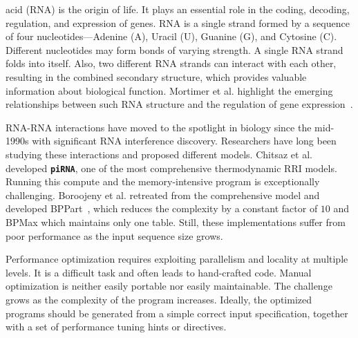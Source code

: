  acid (RNA) is the origin of life. It plays an essential role in the coding, decoding, regulation, and expression of genes. RNA is a single strand formed by a sequence of four nucleotides---Adenine (A), Uracil (U), Guanine (G), and Cytosine (C). Different nucleotides may form bonds of varying strength. A single RNA strand folds into itself. Also, two different RNA strands can interact with each other, resulting in the combined secondary structure, which provides valuable information about biological function. Mortimer et al. highlight the emerging relationships between such RNA structure and the regulation of gene expression~\cite{Mortimer_2014}.

RNA-RNA interactions have moved to the spotlight in biology since the mid-1990s with significant RNA interference discovery. Researchers have long been studying these interactions and proposed different models. Chitsaz et al.\cite{Chitsaz2009} developed \textbf{\texttt{piRNA}}, one of the most comprehensive thermodynamic RRI models. Running this compute and the memory-intensive program is exceptionally challenging.
Boroojeny et al. \cite{EbrahimpourBoroojeny2021} retreated
from the comprehensive model and developed BPPart~\cite{EbrahimpourBoroojeny2021}, which reduces the complexity by a constant factor of  $10$ and BPMax which maintains only one table. Still, these implementations suffer from poor performance as the input
sequence size grows.

Performance optimization requires exploiting parallelism and locality at multiple levels. It is a difficult task and often leads to hand-crafted code. Manual optimization is neither easily portable nor easily maintainable. The challenge grows as the complexity of the program increases. Ideally, the optimized programs should be generated from a simple correct input specification, together with a set of performance tuning hints or directives.

